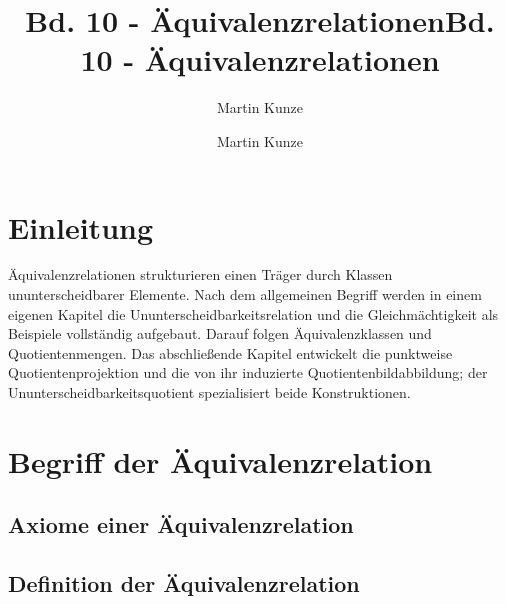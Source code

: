\documentclass[main.tex]{subfiles}
\title{Bd. 10 - Äquivalenzrelationen}
\author{Martin Kunze}
\date{}
\begin{document}
\title{Bd. 10 - Äquivalenzrelationen}
\author{Martin Kunze}
\date{}
\hypersetup{pageanchor=false}
\maketitle
\hypersetup{pageanchor=true}
\setcounter{tocdepth}{3}
\tableofcontents
\setcounter{file}{10}
\renewcommand{\FormulaBandID}{10}

\chapter{Einleitung}

Äquivalenzrelationen strukturieren einen Träger durch Klassen
ununterscheidbarer Elemente. Nach dem allgemeinen Begriff werden in einem
eigenen Kapitel die Ununterscheidbarkeitsrelation und die Gleichmächtigkeit
als Beispiele vollständig aufgebaut. Darauf folgen Äquivalenzklassen und
Quotientenmengen. Das abschließende Kapitel entwickelt die punktweise
Quotientenprojektion und die von ihr induzierte Quotientenbildabbildung; der
Ununterscheidbarkeitsquotient spezialisiert beide Konstruktionen.

\chapter{Begriff der Äquivalenzrelation}

\section{Axiome einer Äquivalenzrelation}




\section{Definition der Äquivalenzrelation}

\end{document}
